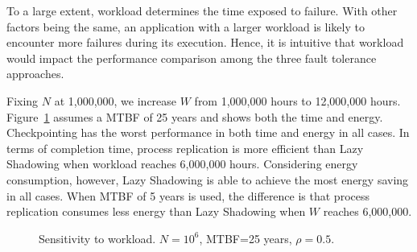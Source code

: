 To a large extent, workload determines the time exposed to failure. With other factors being the same, an application with a larger workload is likely to encounter more failures during its execution. Hence, it is intuitive that workload would impact the performance comparison among the three fault tolerance approaches. 

Fixing $N$ at 1,000,000, we increase $W$ from 1,000,000 hours to 12,000,000 hours. Figure~\ref{fig:w25} assumes a MTBF of 25 years and shows both the time and energy. Checkpointing has the worst performance in both time and energy in all cases. In terms of completion time, process replication is more efficient than Lazy Shadowing when workload reaches 6,000,000 hours. Considering energy consumption, however, Lazy Shadowing is able to achieve the most energy saving in all cases. When MTBF of 5 years is used, the difference is that process replication consumes less energy than Lazy Shadowing when $W$ reaches 6,000,000.

\begin{figure}[!t]
	\begin{center}
	\end{center}
	\vskip -0.04in 
	\caption{Sensitivity to workload. $N=10^6$, MTBF=25 years, $\rho=0.5$.}
	\label{fig:w25}
\end{figure}
